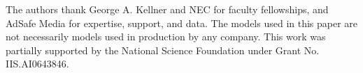 The authors thank George A. Kellner and NEC for faculty fellowships,
and AdSafe Media for expertise, support, and data.  The models used in
this paper are not necessarily models used in production by any
company. This work was partially supported by the National Science 
Foundation under Grant No. IIS.AI0643846.







